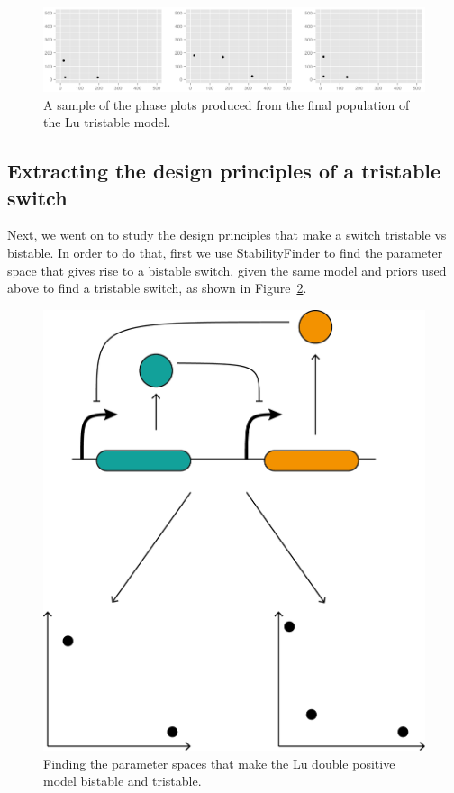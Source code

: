 \begin{figure}[h]
\centering
\includegraphics[scale=0.3]{chapterStabilityFinder/Lu_switches/images/double_pos/phase_plots.png}
\caption{A sample of the phase plots produced from the final population of the Lu tristable model.}
\label{fig:lu_tri_phase_pl}
\end{figure}
\clearpage
\subsection{Extracting the design principles of a tristable switch}
Next, we went on to study the design principles that make a switch tristable vs bistable. In order to do that, first we use StabilityFinder to find the parameter space that gives rise to a bistable switch, given the same model and priors used above to find a tristable switch, as shown in Figure~\ref{fig:lu_bi_tri_cartoon}.

\begin{figure}[h]
\centering
\includegraphics[scale=0.5]{chapterStabilityFinder/Lu_switches/images/double_pos/lu_bi_tri_cartoon.png}
\caption{Finding the parameter spaces that make the Lu double positive model bistable and tristable. }
\label{fig:lu_bi_tri_cartoon}
\end{figure}

